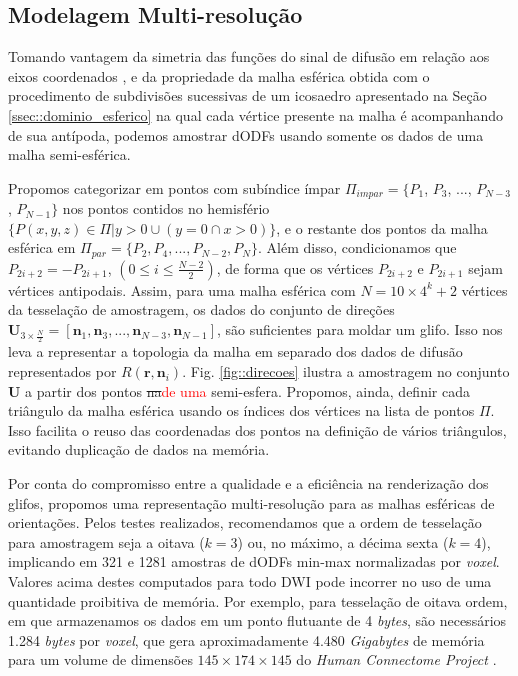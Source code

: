 \subsection{Modelagem Multi-resolução}
\label{ssec:modelagem_multiresolucao}

Tomando vantagem da simetria das funções do sinal de difusão em relação aos eixos coordenados \cite{descoteaux2015}, e da propriedade da malha esférica obtida com o procedimento de subdivisões sucessivas de um icosaedro apresentado na Seção \ref{ssec::dominio_esferico} na qual cada vértice presente na malha é acompanhando de sua antípoda, podemos amostrar dODFs usando somente os dados de uma malha semi-esférica.

Propomos categorizar em pontos com subíndice ímpar $\Pi_{impar} = \{P_1$,
$P_3$, ...,
$P_{N-3}$,
$P_{N-1}\}$ nos pontos contidos no hemisfério $\{P(x, y, z) \in \Pi | y > 0 \cup (y = 0 \cap x > 0)\}$, e o restante dos pontos da malha esférica em $\Pi_{par} = \{P_2, P_4, ..., P_{N-2}, P_{N}\}$. Além disso, condicionamos que $P_{2i+2} = -P_{2i+1}$, $(0 \leq i \leq \frac{N-2}{2})$, de forma que os vértices $P_{2i+2}$ e $P_{2i+1}$ sejam vértices antipodais. Assim, para uma malha esférica com $N = 10 \times 4^k + 2$ vértices da tesselação de amostragem, os dados do conjunto de direções $\mathbf{U}_{3\times \frac{N}{2}} = [
\mathbf{n}_1,
\mathbf{n}_3, ..., 
\mathbf{n}_{N-3},
\mathbf{n}_{N-1}
]$, são suficientes para moldar um glifo. Isso nos leva a representar a topologia da malha em separado dos dados de difusão representados por $R(\mathbf{r},\mathbf{n}_i)$. Fig. \ref{fig::direcoes} ilustra a amostragem no conjunto $\mathbf{U}$ a partir dos pontos \sout{na}\textcolor{red}{de uma} semi-esfera. Propomos, ainda, definir cada triângulo da malha esférica usando os índices dos vértices na lista de pontos $\Pi$. Isso facilita o reuso das coordenadas dos pontos na definição de vários triângulos, evitando duplicação de dados na memória. 

Por conta do compromisso entre a qualidade e a eficiência na renderização dos glifos, propomos uma representação multi-resolução para as malhas esféricas de orientações. Pelos testes realizados, recomendamos que a ordem de tesselação para amostragem seja a oitava ($k=3$) ou, no máximo, a décima sexta ($k=4$), implicando em 321 e 1281 amostras de dODFs min-max normalizadas por \textit{voxel}. Valores acima destes computados para todo DWI pode incorrer no uso de uma quantidade proibitiva de memória. Por exemplo, para tesselação de oitava ordem, em que armazenamos os dados em um ponto flutuante de 4 \textit{bytes}, são necessários 1.284 \textit{bytes} por \textit{voxel}, que gera aproximadamente 4.480 \textit{Gigabytes} de memória para um volume de dimensões $145 \times 174 \times 145$ do \textit{Human Connectome Project} \cite{essen2012}.

